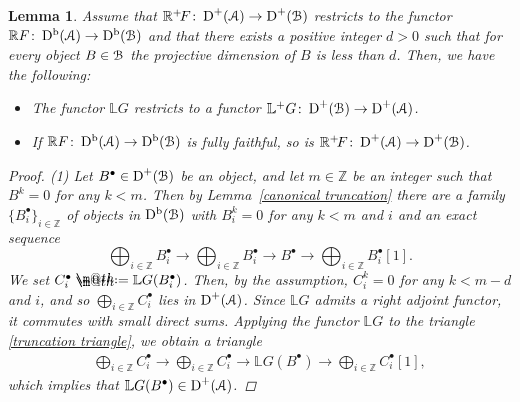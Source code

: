 \documentclass[11pt]{article}
\makeatletter
\numberwithin{equation}{section}
\newtheorem{lem}[dfn]{Lemma}
\newcommand*{\defeq}{\mathrel{\rlap{%
 \raisebox{0.3ex}{$\m@th\cdot$}}%
 \raisebox{-0.3ex}{$\m@th\cdot$}}%
 =}
\numberwithin{equation}{section}
\newcommand{\Db}{\operatorname{D^b}}
\newcommand{\D}{\operatorname{D}}
\newcommand{\bL}{\mathbb{L}}
\newcommand{\bR}{\mathbb{R}}
\newcommand{\bZ}{\mathbb{Z}}
\newcommand{\scrA}{\EuScript{A}}
\newcommand{\scrB}{\EuScript{B}}
\makeatother
\begin{document}
\begin{lem}\label{above ff}
 Assume that $\bR^+\!F\colon \D^+(\scrA)\to \D^+(\scrB)$ restricts to the functor $\bR F\colon \Db(\scrA)\to\Db(\scrB)$ and that there exists a positive integer $d>0$ such that for every object $B\in \scrB$ the projective dimension of $B$ is less than $d$.
 Then, we have the following:
 \begin{itemize}\itemsep=0pt
 \item[$1.$] The functor $\bL G$ restricts to a functor $\bL^{+}G\colon \D^+(\scrB)\to \D^+(\scrA)$.
 \item[$2.$] If $\bR F\colon \Db(\scrA)\to\Db(\scrB)$ is fully faithful, so is $\bR^+\!F\colon \D^+(\scrA)\to \D^+(\scrB)$.
 \end{itemize}
\begin{proof}
(1)
Let $B^{\bullet}\in \D^+(\scrB)$ be an object, and let $m\in\bZ$ be an integer such that $B^k=0$ for any $k<m$. Then by Lemma~\ref{canonical truncation} there are a family $\{B^{\bullet}_i\}_{i\in\bZ}$ of objects in $\Db(\scrB)$ with $B_i^k=0$ for any $k<m$ and $i$ and an exact sequence
\begin{equation}\label{truncation triangle}
\bigoplus_{i\in \bZ}B^{\bullet}_i\to \bigoplus_{i\in \bZ}B^{\bullet}_i\to B^{\bullet}\to \bigoplus_{i\in \bZ}B^{\bullet}_i[1].
\end{equation}
We set $C_i^{\bullet}\defeq\bL G(B^{\bullet}_i)$. Then, by the assumption, $C_i^{k}=0$ for any $k<m-d$ and $i$, and so $\bigoplus_{i\in \bZ}C_i^{\bullet}$ lies in $\D^+(\scrA)$.
Since $\bL G$ admits a right adjoint functor, it commutes with small direct sums.
Applying the functor $\bL G$ to the triangle \eqref{truncation triangle}, we obtain a triangle
\begin{gather*}
\bigoplus_{i\in \bZ}C^{\bullet}_i\to \bigoplus_{i\in \bZ}C^{\bullet}_i\to \bL G(B^{\bullet})\to \bigoplus_{i\in \bZ}C^{\bullet}_i[1],
\end{gather*}
which implies that $\bL G(B^{\bullet})\in\D^+(\scrA)$.



\end{proof}
\end{lem}
\end{document}
